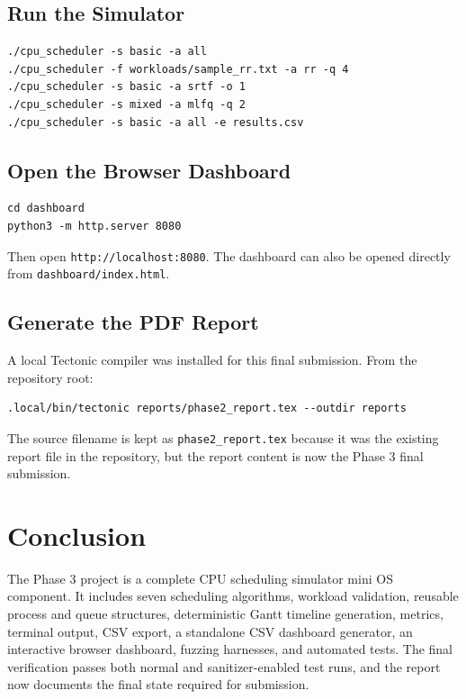 \documentclass[11pt]{article}
\begin{document}
\subsection{Run the Simulator}

\begin{lstlisting}[style=terminal]
./cpu_scheduler -s basic -a all
./cpu_scheduler -f workloads/sample_rr.txt -a rr -q 4
./cpu_scheduler -s basic -a srtf -o 1
./cpu_scheduler -s mixed -a mlfq -q 2
./cpu_scheduler -s basic -a all -e results.csv
\end{lstlisting}

\subsection{Open the Browser Dashboard}

\begin{lstlisting}[style=terminal]
cd dashboard
python3 -m http.server 8080
\end{lstlisting}

Then open \texttt{http://localhost:8080}. The dashboard can also be opened
directly from \texttt{dashboard/index.html}.

\subsection{Generate the PDF Report}

A local Tectonic compiler was installed for this final submission. From the
repository root:

\begin{lstlisting}[style=terminal]
.local/bin/tectonic reports/phase2_report.tex --outdir reports
\end{lstlisting}

The source filename is kept as \texttt{phase2\_report.tex} because it was the
existing report file in the repository, but the report content is now the
Phase 3 final submission.

\section{Conclusion}

The Phase 3 project is a complete CPU scheduling simulator mini OS component.
It includes seven scheduling algorithms, workload validation, reusable process
and queue structures, deterministic Gantt timeline generation, metrics,
terminal output, CSV export, a standalone CSV dashboard generator, an
interactive browser dashboard, fuzzing harnesses, and automated tests. The
final verification passes both normal and sanitizer-enabled test runs, and the
report now documents the final state required for submission.
\end{document}
